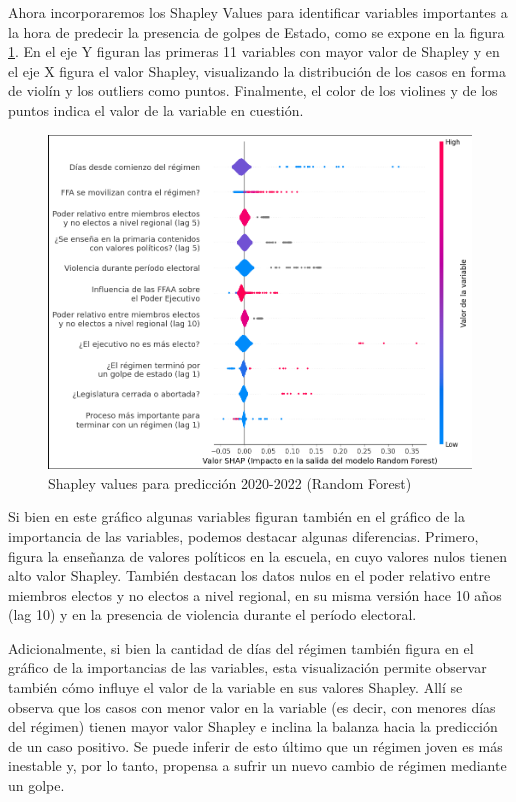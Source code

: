 \documentclass{article}
\begin{document}
Ahora incorporaremos los Shapley Values para identificar variables importantes a la hora
de predecir la presencia de golpes de Estado, como se expone en la figura \ref{fig:shapley}.
En el eje Y figuran las primeras 11 variables con mayor valor de Shapley y en el eje X figura
el valor Shapley, visualizando la distribución de los casos en forma de violín y los outliers 
como puntos. Finalmente, el color de los violines y de los puntos indica el valor de la 
variable en cuestión.

\begin{figure}[H]
  \centering
  \includegraphics[width=1\textwidth]{7_shapley_values.png}
  \caption{Shapley values para predicción 2020-2022 (Random Forest)\label{fig:shapley}}
\end{figure}

Si bien en este gráfico algunas variables figuran también en el gráfico de la importancia
de las variables, podemos destacar algunas diferencias. Primero, figura la enseñanza de 
valores políticos en la escuela, en cuyo valores nulos tienen alto valor Shapley. También 
destacan los datos nulos en el poder relativo entre miembros electos y no electos a nivel 
regional, en su misma versión hace 10 años (lag 10) y en la presencia de violencia durante 
el período electoral.

Adicionalmente, si bien la cantidad de días del régimen también figura en el gráfico de la 
importancias de las variables, esta visualización permite observar también cómo influye el valor
de la variable en sus valores Shapley. Allí se observa que los casos con menor valor en la variable 
(es decir, con menores días del régimen) tienen mayor valor Shapley e inclina la balanza hacia la 
predicción de un caso positivo. Se puede inferir de esto último que un régimen joven es más 
inestable y, por lo tanto, propensa a sufrir un nuevo cambio de régimen mediante un golpe.
\end{document}
